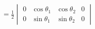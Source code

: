 \documentclass[preview]{standalone}
\begin{document}
\begin{align*}
=\frac{1}{2}\begin{vmatrix} 0 & \cos\theta_1 & \cos\theta_2 & 0 \\ 0 &  \sin\theta_1& \sin\theta_2 & 0 \end{vmatrix}
\end{align*}
\end{document}
